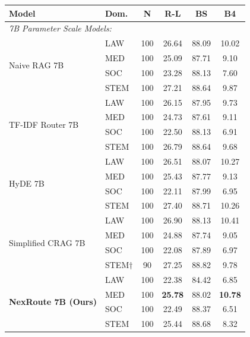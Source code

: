 \documentclass[a4paper,fleql,doubleblind]{cas-sc}
\begin{document}
\begin{center}
\begingroup
\small
\renewcommand{\arraystretch}{0.9}
\label{tab:domain_breakdown}
\begin{tabular}{llcccc}
\toprule
\textbf{Model} & \textbf{Dom.} & \textbf{N} & \textbf{R-L} & \textbf{BS} & \textbf{B4} \\
\midrule
\multicolumn{6}{l}{\textit{7B Parameter Scale Models:}} \\
\multirow{4}{*}{Naive RAG 7B}
  & LAW  & 100 & 26.64 & 88.09 & 10.02 \\
  & MED  & 100 & 25.09 & 87.71 &  9.10 \\
  & SOC  & 100 & 23.28 & 88.13 &  7.60 \\
  & STEM & 100 & 27.21 & 88.64 &  9.87 \\
\midrule
\multirow{4}{*}{TF-IDF Router 7B}
  & LAW  & 100 & 26.15 & 87.95 &  9.73 \\
  & MED  & 100 & 24.73 & 87.61 &  9.11 \\
  & SOC  & 100 & 22.50 & 88.13 &  6.91 \\
  & STEM & 100 & 26.79 & 88.64 &  9.68 \\
\midrule
\multirow{4}{*}{HyDE 7B}
  & LAW  & 100 & 26.51 & 88.07 & 10.27 \\
  & MED  & 100 & 25.43 & 87.77 &  9.13 \\
  & SOC  & 100 & 22.11 & 87.99 &  6.95 \\
  & STEM & 100 & 27.40 & 88.71 & 10.26 \\
\midrule
\multirow{4}{*}{Simplified CRAG 7B}
  & LAW  & 100 & 26.90 & 88.13 & 10.41 \\
  & MED  & 100 & 24.88 & 87.74 &  9.05 \\
  & SOC  & 100 & 22.08 & 87.89 &  6.97 \\
  & STEM$\dagger$ &  90 & 27.25 & 88.82 &  9.78 \\
\midrule
\multirow{4}{*}{\textbf{NexRoute 7B (Ours)}}
  & LAW  & 100 & 22.38 & 84.42 &  6.85 \\
  & MED  & 100 & \textbf{25.78} & 88.02 & \textbf{10.78} \\
  & SOC  & 100 & 22.49 & 88.37 &  6.51 \\
  & STEM & 100 & 25.44 & 88.68 &  8.32 \\
\bottomrule
\end{tabular}
\endgroup
\end{center}
\end{document}
